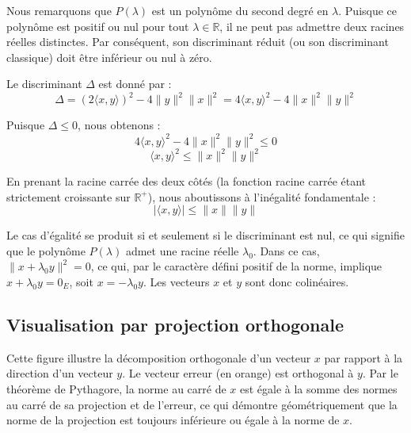 \documentclass[11pt,a4paper]{report}
\begin{document}
Nous remarquons que $P(\lambda)$ est un polynôme du second degré en $\lambda$. Puisque ce polynôme est positif ou nul pour tout $\lambda \in \mathbb{R}$, il ne peut pas admettre deux racines réelles distinctes. Par conséquent, son discriminant réduit (ou son discriminant classique) doit être inférieur ou nul à zéro.

Le discriminant $\Delta$ est donné par :
$$\Delta = (2\langle x, y \rangle)^2 - 4 \|y\|^2 \|x\|^2 = 4 \langle x, y \rangle^2 - 4 \|x\|^2 \|y\|^2$$

Puisque $\Delta \le 0$, nous obtenons :
$$4 \langle x, y \rangle^2 - 4 \|x\|^2 \|y\|^2 \le 0$$
$$\langle x, y \rangle^2 \le \|x\|^2 \|y\|^2$$

En prenant la racine carrée des deux côtés (la fonction racine carrée étant strictement croissante sur $\mathbb{R}^+$), nous aboutissons à l'inégalité fondamentale :
$$| \langle x, y \rangle | \le \|x\| \|y\|$$

Le cas d'égalité se produit si et seulement si le discriminant est nul, ce qui signifie que le polynôme $P(\lambda)$ admet une racine réelle $\lambda_0$. Dans ce cas, $\|x + \lambda_0 y\|^2 = 0$, ce qui, par le caractère défini positif de la norme, implique $x + \lambda_0 y = 0_E$, soit $x = -\lambda_0 y$. Les vecteurs $x$ et $y$ sont donc colinéaires.

\subsection{Visualisation par projection orthogonale}
\begin{center}
\end{center}
Cette figure illustre la décomposition orthogonale d'un vecteur $x$ par rapport à la direction d'un vecteur $y$. Le vecteur erreur (en orange) est orthogonal à $y$. Par le théorème de Pythagore, la norme au carré de $x$ est égale à la somme des normes au carré de sa projection et de l'erreur, ce qui démontre géométriquement que la norme de la projection est toujours inférieure ou égale à la norme de $x$.
\end{document}
